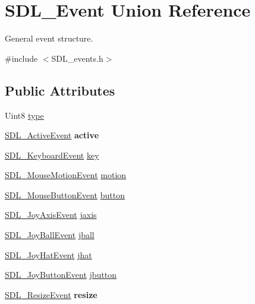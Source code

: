 \hypertarget{unionSDL__Event}{\section{S\+D\+L\+\_\+\+Event Union Reference}
\label{unionSDL__Event}
}


General event structure.  




{\ttfamily \#include $<$S\+D\+L\+\_\+events.\+h$>$}

\subsection*{Public Attributes}
\begin{DoxyCompactItemize}
\item 
Uint8 \hyperlink{unionSDL__Event_a237648bec242d2d5835f1a4250ddfa46}{type}
\item 
\hypertarget{unionSDL__Event_ab8b2b899275fb4116ec85ae5a926b23d}{\hyperlink{structSDL__ActiveEvent}{S\+D\+L\+\_\+\+Active\+Event} {\bfseries active}}\label{unionSDL__Event_ab8b2b899275fb4116ec85ae5a926b23d}

\item 
\hyperlink{structSDL__KeyboardEvent}{S\+D\+L\+\_\+\+Keyboard\+Event} \hyperlink{unionSDL__Event_ab99927835cc77a9b6bb50b419b4a27df}{key}
\item 
\hyperlink{structSDL__MouseMotionEvent}{S\+D\+L\+\_\+\+Mouse\+Motion\+Event} \hyperlink{unionSDL__Event_ac3c89e190faacbe84280cd539453bab6}{motion}
\item 
\hyperlink{structSDL__MouseButtonEvent}{S\+D\+L\+\_\+\+Mouse\+Button\+Event} \hyperlink{unionSDL__Event_ab6da2fa2687e5f849f270adecc64785f}{button}
\item 
\hyperlink{structSDL__JoyAxisEvent}{S\+D\+L\+\_\+\+Joy\+Axis\+Event} \hyperlink{unionSDL__Event_ac4611acd0e9c675e67dc20919f0accb4}{jaxis}
\item 
\hyperlink{structSDL__JoyBallEvent}{S\+D\+L\+\_\+\+Joy\+Ball\+Event} \hyperlink{unionSDL__Event_ae433f511e3383d17f8fe02df745ee8f8}{jball}
\item 
\hyperlink{structSDL__JoyHatEvent}{S\+D\+L\+\_\+\+Joy\+Hat\+Event} \hyperlink{unionSDL__Event_a421b40e0f8e01f181c8d5548cff1dd1d}{jhat}
\item 
\hyperlink{structSDL__JoyButtonEvent}{S\+D\+L\+\_\+\+Joy\+Button\+Event} \hyperlink{unionSDL__Event_a591104d64903ae1cf70874fb5d3124ff}{jbutton}
\item 
\hypertarget{unionSDL__Event_a6e82d8628b9402aaa7660ebf0162228a}{\hyperlink{structSDL__ResizeEvent}{S\+D\+L\+\_\+\+Resize\+Event} {\bfseries resize}}\label{unionSDL__Event_a6e82d8628b9402aaa7660ebf0162228a}


\end{DoxyCompactItemize}
